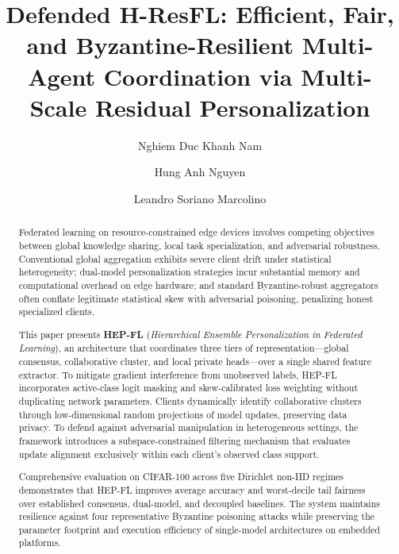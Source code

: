 \documentclass[sigconf]{acmart}
\begin{document}
\title{Defended H-ResFL: Efficient, Fair, and Byzantine-Resilient Multi-Agent Coordination via Multi-Scale Residual Personalization}

\author{Nghiem Duc Khanh Nam}

\author{Hung Anh Nguyen}
\authornotemark[1]

\author{Leandro Soriano Marcolino}

\begin{abstract}
Federated learning on resource-constrained edge devices involves competing objectives between global knowledge sharing, local task specialization, and adversarial robustness. Conventional global aggregation exhibits severe client drift under statistical heterogeneity; dual-model personalization strategies incur substantial memory and computational overhead on edge hardware; and standard Byzantine-robust aggregators often conflate legitimate statistical skew with adversarial poisoning, penalizing honest specialized clients.

This paper presents \textbf{HEP-FL} (\textit{Hierarchical Ensemble Personalization in Federated Learning}), an architecture that coordinates three tiers of representation---global consensus, collaborative cluster, and local private heads---over a single shared feature extractor. To mitigate gradient interference from unobserved labels, HEP-FL incorporates active-class logit masking and skew-calibrated loss weighting without duplicating network parameters. Clients dynamically identify collaborative clusters through low-dimensional random projections of model updates, preserving data privacy. To defend against adversarial manipulation in heterogeneous settings, the framework introduces a subspace-constrained filtering mechanism that evaluates update alignment exclusively within each client's observed class support.

Comprehensive evaluation on CIFAR-100 across five Dirichlet non-IID regimes demonstrates that HEP-FL improves average accuracy and worst-decile tail fairness over established consensus, dual-model, and decoupled baselines. The system maintains resilience against four representative Byzantine poisoning attacks while preserving the parameter footprint and execution efficiency of single-model architectures on embedded platforms.
\end{abstract}
\end{document}

